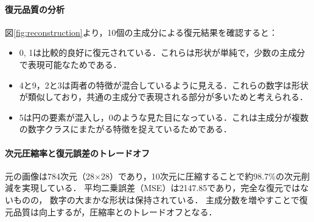 \paragraph{復元品質の分析}
図\ref{fig:reconstruction}より，10個の主成分による復元結果を確認すると：
\begin{itemize}
    \item 0, 1は比較的良好に復元されている．これらは形状が単純で，少数の主成分で表現可能なためである．
    \item 4と9，2と3は両者の特徴が混合しているように見える．これらの数字は形状が類似しており，共通の主成分で表現される部分が多いためと考えられる．
    \item 5は円の要素が混入し，0のような見た目になっている．これは主成分が複数の数字クラスにまたがる特徴を捉えているためである．
\end{itemize}

\paragraph{次元圧縮率と復元誤差のトレードオフ}
元の画像は784次元（28×28）であり，10次元に圧縮することで約98.7\%の次元削減を実現している．
平均二乗誤差（MSE）は2147.85であり，完全な復元ではないものの，
数字の大まかな形状は保持されている．
主成分数を増やすことで復元品質は向上するが，圧縮率とのトレードオフとなる．
